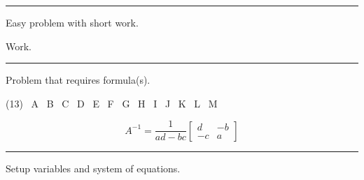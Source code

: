 \noindent\rule{\textwidth}{1pt}

\begin{question}{3}
  \label{question:easy-problem}
  Easy problem with short work.
\end{question}
\begin{minipage}{0.75\textwidth}
  \begin{solution}
    Work.
  \end{solution}
\end{minipage}\hspace{\fill}%
\begin{minipage}{0.25\textwidth}
  \vspace{0.1in}
\end{minipage}

\noindent\rule{\textwidth}{1pt}

\begin{question}{6}
  \label{question:formula-problem}
  Problem that requires formula(s).
  \begin{tasks}(13)
    \task[\selectall] \ A
    \task[\selectall] \ B
    \task[\selectall] \ C
    \task[\selectall] \ D
    \task[\selectall] \ E
    \task[\selectall] \ F
    \task[\selectall] \ G
    \task[\correctselectall] \ H
    \task[\selectall] \ I
    \task[\selectall] \ J
    \task[\selectall] \ K
    \task[\selectall] \ L
    \task[\selectall] \ M
  \end{tasks}
\end{question}
\begin{minipage}{0.75\textwidth}
  \begin{solution}
    \[A^{-1} = \dfrac{1}{ad - bc}
      \begin{bmatrix}
        d & -b \\
        -c & a
      \end{bmatrix}
    \]
  \end{solution}
\end{minipage}\hspace{\fill}%
\begin{minipage}{0.25\textwidth}
  \vspace{0.5in}
  \vspace{0.1in}
\end{minipage}

\noindent\rule{\textwidth}{1pt}

\begin{question}{6}
  \label{question:setup-system}
  Setup variables and system of equations.\\[0.2in]
  \begin{minipage}{0.45\textwidth}
  \end{minipage}\hspace{\fill}%
  \begin{minipage}{0.45\textwidth}
  \end{minipage}
\end{question}

